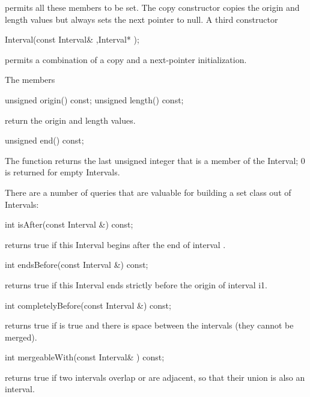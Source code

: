 permits all these members to be set.  The copy constructor copies
the origin and length values but always sets the next pointer to null.
A third constructor

\begin{example}
Interval(const Interval& ,Interval* );
\end{example}

permits a combination of a copy and a next-pointer initialization.

The members

\begin{example}
unsigned origin() const;
unsigned length() const;
\end{example}

return the origin and length values.

\begin{example}
unsigned end() const;
\end{example}

The  function returns the last unsigned integer that is a
member of the Interval; 0 is returned for empty Intervals.

There are a number of queries that are valuable for building a set
class out of Intervals:

\begin{example}
int isAfter(const Interval &) const;
\end{example}

 returns true if this Interval begins after the end of
interval 
.
\begin{example}
int endsBefore(const Interval &) const;
\end{example}

 returns true if this Interval ends strictly before
the origin of interval i1.

\begin{example}
int completelyBefore(const Interval &) const;
\end{example}

 returns true if  is true and there
is space between the intervals (they cannot be merged).

\begin{example}
int mergeableWith(const Interval& ) const;
\end{example}

 returns true if two intervals overlap or are
adjacent, so that their union is also an interval.

